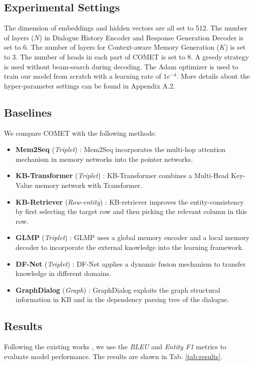 \documentclass[11pt]{article}
\begin{document}
\subsection{Experimental Settings}
The dimension of embeddings and hidden vectors are all set to 512. The number of layers ($N$) in Dialogue History Encoder and Response Generation Decoder is set to 6. The number of layers for Context-aware Memory Generation ($K$) is set to 3. The number of heads in each part of COMET is set to 8. A greedy strategy is used without beam-search during decoding. The Adam optimizer \cite{kingma2014adam} is used to train our model from scratch with a learning rate of $1e^{-4}$. More details about the hyper-parameter settings can be found in Appendix A.2.

\subsection{Baselines}
We compare COMET with the following methods: 
\begin{itemize}
    \item \textbf{Mem2Seq} (\textit{Triplet}) \cite{madotto-etal-2018-mem2seq}: Mem2Seq incorporates the multi-hop attention mechanism in memory networks into the pointer networks.
    \item \textbf{KB-Transformer} (\textit{Triplet}) \cite{h-2019-kbtransformer}: KB-Transformer combines a Multi-Head Key-Value memory network with Transformer.
    \item \textbf{KB-Retriever} (\textit{Row-entity}) \cite{qin-etal-2019-entity}: KB-retriever improves the entity-consistency by first selecting the target row and then picking the relevant column in this row.
    \item \textbf{GLMP} (\textit{Triplet}) \cite{wu2018globaltolocal}: GLMP uses a global memory encoder and a local memory decoder to incorporate the external knowledge into the learning framework.
    \item \textbf{DF-Net} (\textit{Triplet}) \cite{qin-etal-2020-dynamic}: DF-Net applies a dynamic fusion mechanism to transfer knowledge in different domains.
    \item \textbf{GraphDialog} (\textit{Graph}) \cite{yang-etal-2020-graphdialog}: GraphDialog exploits  the  graph  structural information in KB and in the dependency parsing tree of the dialogue.
\end{itemize}


\subsection{Results}
Following the existing works \cite{qin-etal-2020-dynamic, yang-etal-2020-graphdialog}, we use the \textit{BLEU} and \textit{Entity F1}
metrics to evaluate model performance. The results are shown in Tab. \ref{tab:results}. 
\end{document}
